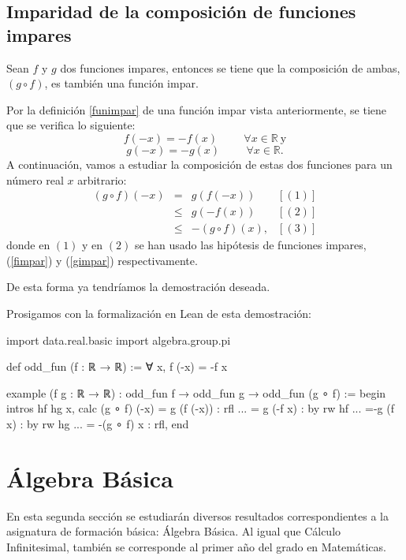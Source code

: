 \subsection{Imparidad de la composición de funciones impares}
\begin{teorema}
  Sean \(f\) y \(g\) dos funciones impares, entonces
  se tiene que la composición de ambas,
  \( (g ∘ f)\), es también una función impar.
\end{teorema}
\begin{demostracion}
  Por la definición \ref{funimpar} de una función impar
  vista anteriormente, se tiene que se verifica lo siguiente:
  \begin{equation}\label{fimpar}
  f(-x)=-f(x)\hspace{1cm}∀ x ∈ ℝ \ \text{y}
  \end{equation}
  \begin{equation}\label{gimpar}
  g(-x)=-g(x)\hspace{1cm}∀ x ∈ ℝ.
  \end{equation}
  A continuación, vamos a estudiar la composición de estas dos funciones
  para un número real \(x\) arbitrario:
  \[\begin{array}{llll}
  	(g ∘ f)(-x) &= &g(f(-x))   & [(1)]\\
                    &≤ &g(-f(x)) & [(2)] \\
                    &≤ &-(g ∘ f)(x),& [(3)] 
  \end{array}\]
  donde en \((1)\) y en \((2)\) se han usado las hipótesis de funciones
  impares, (\ref{fimpar}) y (\ref{gimpar}) respectivamente.

  De esta forma ya tendríamos la demostración deseada.
\end{demostracion}

Prosigamos con la formalización en Lean de esta demostración:
\begin{leancode}
import data.real.basic
import algebra.group.pi

def odd_fun (f : ℝ → ℝ) := ∀ x, f (-x) = -f x

example (f g : ℝ → ℝ) : odd_fun f → odd_fun g →  odd_fun (g ∘ f) :=
begin
intros hf hg x,
calc (g ∘ f) (-x)
    = g (f (-x)) : rfl
... = g (-f x)   : by rw hf
... =-g (f x)    : by rw hg
... = -(g ∘ f) x : rfl,
end
\end{leancode}

\section{Álgebra Básica}
En esta segunda sección se estudiarán diversos resultados
correspondientes a la asignatura de formación básica: Álgebra Básica.
Al igual que Cálculo Infinitesimal, también se corresponde al primer
año del grado en Matemáticas.

